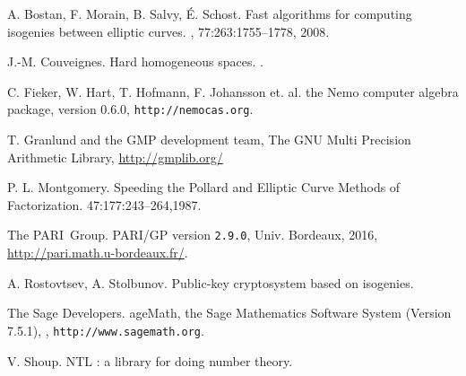 \documentclass[12pt]{article}
\begin{document}
\begin{thebibliography}{99}

A. Bostan, F. Morain, B. Salvy, \'E. Schost.
\newblock Fast algorithms for computing isogenies between elliptic curves.
, 77:263:1755--1778, 2008.

J.-M. Couveignes.
\newblock Hard homogeneous spaces.
.

C. Fieker, W. Hart, T. Hofmann, F. Johansson et. al.
\newblock the Nemo computer algebra package, version 0.6.0, {\tt http://nemocas.org}.

T. Granlund and the GMP development team,
\newblock The GNU Multi Precision Arithmetic Library, \url{http://gmplib.org/}

P. L. Montgomery.
\newblock Speeding the Pollard and Elliptic Curve Methods of Factorization.
 47:177:243--264,1987.

The PARI~Group.
\newblock PARI/GP version {\tt 2.9.0}, Univ. Bordeaux, 2016, \url{http://pari.math.u-bordeaux.fr/}.

A. Rostovtsev, A. Stolbunov.
\newblock Public-key cryptosystem based on isogenies.

The Sage Developers.
ageMath, the {S}age {M}athematics {S}oftware {S}ystem ({V}ersion
  7.5.1),
, {\tt http://www.sagemath.org}.

V. Shoup.
\newblock NTL : a library for doing number theory.





\end{thebibliography}
\end{document}
